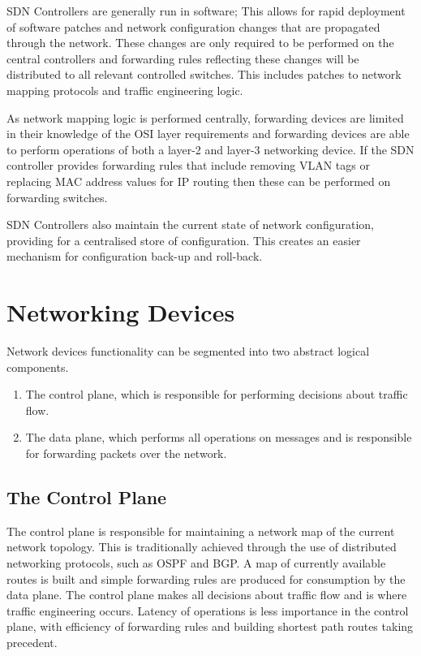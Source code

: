 SDN Controllers are generally run in software; This allows for rapid deployment of software patches and network configuration changes that are propagated through the network. These changes are only required to be performed on the central controllers and forwarding rules reflecting these changes will be distributed to all relevant controlled switches. This includes patches to network mapping protocols and traffic engineering logic.

As network mapping logic is performed centrally, forwarding devices are limited in their knowledge of the OSI layer requirements and forwarding devices are able to perform operations of both a layer-2 and layer-3 networking device. If the SDN controller provides forwarding rules that include removing VLAN tags or replacing MAC address values for IP routing then these can be performed on forwarding switches.

SDN Controllers also maintain the current state of network configuration, providing for a centralised store of configuration. This creates an easier mechanism for configuration back-up and roll-back.

\section{Networking Devices}
Network devices functionality can be segmented into two abstract logical components. 
\begin{enumerate}
    \item The control plane, which is responsible for performing decisions about traffic flow.
    \item The data plane, which performs all operations on messages and is responsible for forwarding packets over the network.
\end{enumerate}

\subsection{The Control Plane}
The control plane is responsible for maintaining a network map of the current network topology. This is traditionally achieved through the use of distributed networking protocols, such as OSPF and BGP. A map of currently available routes is built and simple forwarding rules are produced for consumption by the data plane.
The control plane makes all decisions about traffic flow and is where traffic engineering occurs. Latency of operations is less importance in the control plane, with efficiency of forwarding rules and building shortest path routes taking precedent. \cite{control_plane_tech_target}

